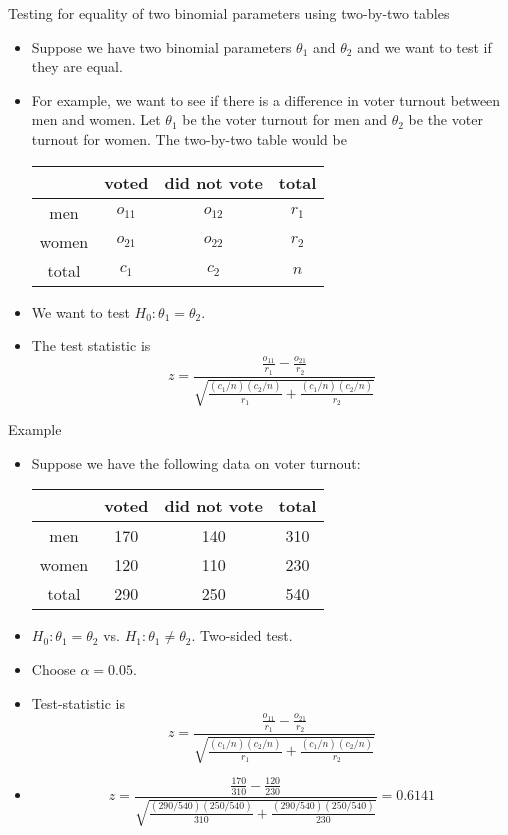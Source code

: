 \documentclass[10pt, xcolor=table]{beamer}
\newcommand*\themecol{\usebeamercolor[fg]{structure}}
\begin{document}
\begin{frame}{Testing for equality of two binomial parameters using two-by-two tables}
\begin{itemize}\itemsep2ex
\item Suppose we have two binomial parameters $\theta_1$ and $\theta_2$ and we want to test if they are equal.
\item For example, we want to see if there is a difference in voter turnout between men and women. Let $\theta_1$ be the voter turnout for men and $\theta_2$ be the voter turnout for women. The two-by-two table would be
\medskip
{\footnotesize
\begin{table}[]
\begin{tabular}{|c|cc|c|}
\hline
      & voted & did not vote & total \\ \hline
men   & $o_{11}$ & $o_{12}$        & $r_1$  \\ 
women & $o_{21}$ & $o_{22}$        & $r_2$  \\ \hline
total & $c_1$  & $c_2$         & $n$     \\ \hline
\end{tabular}
\end{table}
}
\item We want to test $H_0: \theta_1 = \theta_2$.
\item The test statistic is
{\themecol
\[
z = \frac{\frac{o_{11}}{r_1}-\frac{o_{21}}{r_2}}{\sqrt{\frac{(c_1/n)(c_2/n)}{r_1}+\frac{(c_1/n)(c_2/n)}{r_2}}}
\]
}
\end{itemize}
\end{frame}

\begin{frame}{Example}
\begin{itemize}
\setlength{\itemsep}{8pt}
\item Suppose we have the following data on voter turnout:
\medskip
{\footnotesize
\begin{table}[]
\begin{tabular}{|c|cc|c|}
\hline
      & voted & did not vote & total \\ \hline
men   & 170 & 140       & 310  \\ 
women & 120 & 110        & 230  \\ \hline
total & 290  & 250        & 540     \\ \hline
\end{tabular}
\end{table}
}
\item<1->[Step 1] $H_0: \theta_1 = \theta_2$ vs. $H_1: \theta_1 \neq \theta_2$. Two-sided test. 
\item<2->[Step 2] Choose $\alpha = 0.05$. 
\item<3->[Step 3] Test-statistic is 
{\small
\[
z = \frac{\frac{o_{11}}{r_1}-\frac{o_{21}}{r_2}}{\sqrt{\frac{(c_1/n)(c_2/n)}{r_1}+\frac{(c_1/n)(c_2/n)}{r_2}}}
\]
}
\item<4->[]
{\small
\[
z = \frac{\frac{170}{310}-\frac{120}{230}}{\sqrt{\frac{(290/540)(250/540)}{310}+\frac{(290/540)(250/540)}{230}}} = 0.6141
\]
}
\end{itemize}
\end{frame}
\end{document}
